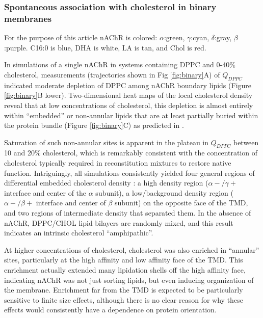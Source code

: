 \subsubsection {Spontaneous association with cholesterol in binary membranes} \label{binary}

For the purpose of this article nAChR is colored: $\alpha$:green, $\gamma$:cyan, $\delta$:gray, $\beta$:purple. C16:0 is blue, DHA is white, LA is tan, and Chol is red.

In simulations of a single nAChR in systems containing DPPC and 0-40\% cholesterol, measurements (trajectories shown in Fig \ref{fig:binary}A) of $Q_{DPPC}$ indicated moderate depletion of DPPC among nAChR boundary lipids (Figure \ref{fig:binary}B lower).  Two-dimensional heat maps of the local cholesterol density reveal that at low concentrations of cholesterol, this depletion is almost entirely within ``embedded'' or non-annular lipids that are at least partially buried within the protein bundle (Figure \ref{fig:binary}C) as predicted in \cite{Brannigan_Embedded_2008}.

Saturation of such non-annular sites is apparent in the plateau in $Q_{DPPC}$ between 10 and 20\% cholesterol, which is remarkably consistent with the concentration of cholesterol typically required in reconstitution mixtures to restore native function.  \cite{reconstitute}  Intriguingly, all simulations consistently yielded four general regions of differential embedded cholesterol density : a high density region ($\alpha-/\gamma+$ interface and center of the $\alpha$ subunit), a low/background density region ($\alpha-/\beta+$ interface and center of $\beta$ subunit) on the opposite face of the TMD, and two regions of intermediate density that separated them.  In the absence of nAChR, DPPC/CHOL lipid bilayers are randomly mixed, and this result indicates an intrinsic cholesterol ``amphipathic''.  

At higher concentrations of cholesterol, cholesterol was also enriched in ``annular'' sites, particularly at the high affinity and low affinity face of the TMD.  This enrichment actually extended many lipidation shells off the high affinity face, indicating nAChR was not just sorting lipids, but even inducing organization of the membrane. Enrichment far from the TMD is expected to be particularly sensitive to finite size effects, although there is no clear reason for why these effects would consistently have a dependence on protein orientation.  

